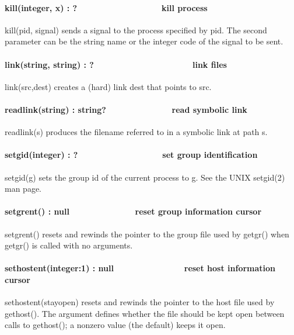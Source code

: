 \paragraph[kill(integer, x) : ?\ \ \ \ \ \ \ \ \ \ \ \ \ \ \ \  \ \ kill
process]{kill(integer, x) : ?\ \ \ \ \ \ \ \ \ \ \ \ \ \ \ \  \ \ kill
process}
kill(pid, signal) sends a signal to the process specified by pid. The
second parameter can be the string name or the integer code of the
signal to be sent.

\paragraph[link(string, string) : ?\ \ \ \ \ \ \ \ \ \ \ \ \ \ 
\ \ \ \ \ \ \ link files]{link(string, string) :
?\ \ \ \ \ \ \ \ \ \ \ \ \ \  \ \ \ \ \ \ \ link files}
link(src,dest) creates a (hard) link dest that
points to src.

\paragraph[readlink(string) : string?\ \ \ \ \ \ \ \ \ \ \ \  \ \ read
symbolic link]{readlink(string) : string?\ \ \ \ \ \ \ \ \ \ \ \ 
\ \ read symbolic link}
readlink(s) produces the filename referred to in a symbolic link at path
s.

\paragraph[setgid(integer) : ?\ \ \ \ \ \ \ \ \ \ \ \  \ \ \ \ \ \ set
group identification]{setgid(integer) : ?\ \ \ \ \ \ \ \ \ \ \ \ 
\ \ \ \ \ \ set group identification}
setgid(g) sets the group id of the current process to g. See the UNIX
setgid(2) man page. 

\paragraph[setgrent() : null\ \ \ \ \ \ \ \ \ \  \ \ \ \ reset group
information cursor]{setgrent() : null\ \ \ \ \ \ \ \ \ \  \ \ \ \ reset
group information cursor}
setgrent() resets and rewinds the pointer to the group file used by
getgr() when getgr() is called with no arguments. 

\paragraph[sethostent(integer:1) : null\ \ \ \ \ \ \ \ 
\ \ \ \ \ \ \ reset host information cursor]{sethostent(integer:1) :
null\ \ \ \ \ \ \ \  \ \ \ \ \ \ \ reset host information cursor}
sethostent(stayopen) resets and rewinds the pointer to the host file
used by gethost(). The argument defines whether the file should be kept
open between calls to gethost(); a nonzero value (the default) keeps it
open. 

